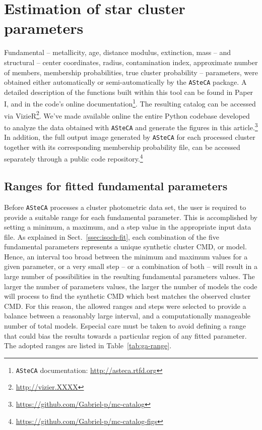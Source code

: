 \documentclass{aa}
\begin{document}

\section{Estimation of star cluster parameters}
\label{sec:fund-params}

Fundamental -- metallicity, age, distance modulus, extinction, mass -- and
structural -- center coordinates, radius, contamination index, approximate
number of members, membership probabilities, true cluster probability --
parameters, were obtained either automatically or semi-automatically by the
\texttt{ASteCA} package.
%
A detailed description of the functions built within this tool can be found in
Paper I, and in the code's online documentation\footnote{\texttt{ASteCA}
documentation: \url{http://asteca.rtfd.org}}.
%
The resulting catalog can be accessed via
VizieR\footnote{\url{http://vizier.XXXX}}.
We've made available online the entire Python codebase developed to analyze
the data obtained with \texttt{ASteCA} and generate the figures in this
article.\footnote{\url{https://github.com/Gabriel-p/mc-catalog}}
%
In addition, the full output image generated by \texttt{ASteCA} for each
processed cluster together with its corresponding membership probability file,
can be accessed separately through a public code
repository.\footnote{\url{https://github.com/Gabriel-p/mc-catalog-figs}}



\subsection{Ranges for fitted fundamental parameters}
\label{ssec:param-ranges}

Before \texttt{ASteCA} processes a cluster photometric data set, the user is
required to provide a suitable range for each fundamental parameter. This is
accomplished by setting a minimum, a maximum, and a step value in the
appropriate input data file.
%
As explained in Sect.~\ref{ssec:isoch-fit}, each combination of the five
fundamental parameters represents a unique synthetic cluster CMD, or model.
%
Hence, an interval too broad between the minimum and maximum
values for a given parameter, or a very small step -- or a combination of
both -- will result in a large number of possibilities in the resulting
fundamental parameters values.
%
The larger the number of parameters values, the larger the number of models the
code will process to find the synthetic CMD which best matches the observed
cluster CMD.\@
%
For this reason, the allowed ranges and steps were selected to provide
a balance between a reasonably large interval, and a computationally manageable
number of total models.
Especial care must be taken to avoid defining a range that could bias the
results towards a particular region of any fitted parameter.
The adopted ranges are listed in Table~\ref{tab:ga-range}.\\
\end{document}
